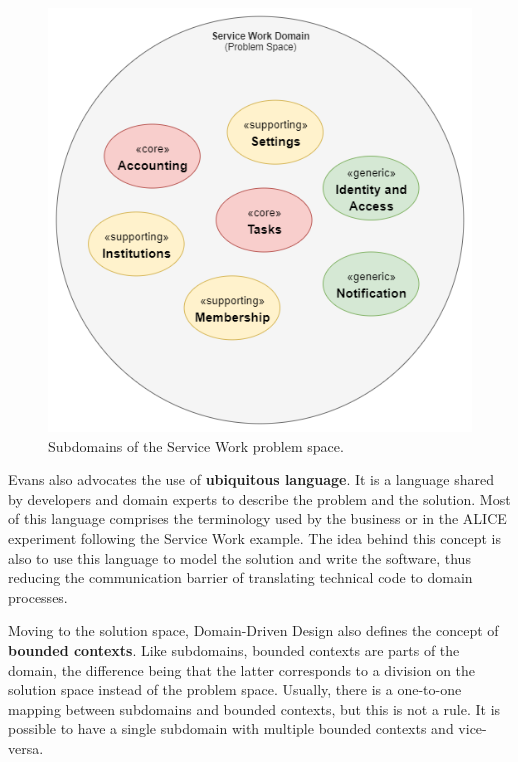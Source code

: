 \begin{figure}[htbp]
  \centering
  \includegraphics[scale=0.6]{Imagens/chap04/sw-subdomains-diagram.png}
  \caption{Subdomains of the Service Work problem space.}
  \label{fig:sw-subdomains-diagram}
\end{figure}

Evans \cite{ddd-blue-book} also advocates the use of \textbf{ubiquitous language}. It is a language shared by developers and domain experts to describe the problem and the solution. Most of this language comprises the terminology used by the business or in the ALICE experiment following the Service Work example. The idea behind this concept is also to use this language to model the solution and write the software, thus reducing the communication barrier of translating technical code to domain processes.

Moving to the solution space, Domain-Driven Design also defines the concept of \textbf{bounded contexts}. Like subdomains, bounded contexts are parts of the domain, the difference being that the latter corresponds to a division on the solution space instead of the problem space. Usually, there is a one-to-one mapping between subdomains and bounded contexts, but this is not a rule. It is possible to have a single subdomain with multiple bounded contexts and vice-versa.

